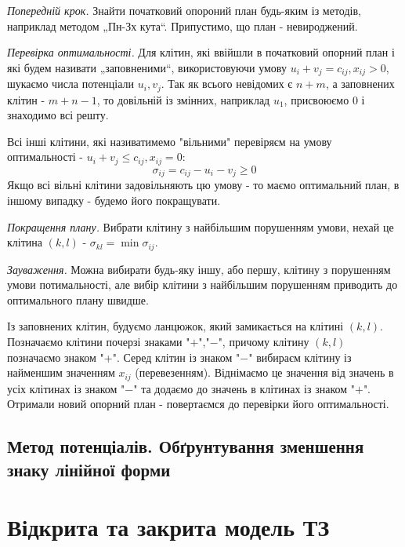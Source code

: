 \documentclass[12pt,a4paper]{book}
\newenvironment{slim_enumerate}{
\begin{enumerate}
  \setlength{\itemsep}{1pt}
  \setlength{\parskip}{0pt}
  \setlength{\parsep}{0pt}}
{\end{enumerate}}
\begin{document}
\begin{slim_enumerate}
  \item \emph{Попередній крок.} Знайти початковий опороний план будь-яким із методів, наприклад методом „Пн-Зх кута“. Припустимо, що план - невироджений.

  \item \emph{Перевірка оптимальності.} Для клітин, які ввійшли в початковий опорний план і які будем називати „заповненими“, використовуючи умову $u_i + v_j = c_{ij}, x_{ij} > 0$, шукаємо числа потенціали $u_i, v_j$. Так як всього невідомих є $n+m$, а заповнених клітин - $m+n-1$, то довільній із змінних, наприклад $u_1$, присвоюємо $0$ і знаходимо всі решту.

Всі інші клітини, які називатимемо "вільними" перевіряєм на умову оптимальності - $u_i + v_j \le c_{ij}, x_{ij} = 0$:
\begin{equation} \sigma_{ij} = c_{ij} - u_i - v_j \ge 0\end{equation}
Якщо всі вільні клітини задовільняють цю умову - то маємо оптимальний план, в іншому випадку - будемо його покращувати.

  \item \emph{Покращення плану.} Вибрати клітину з найбільшим порушенням умови, нехай це клітина $(k,l)$ - $\sigma_{kl} = \min \sigma_{ij}$.

\emph{Зауваження.} Можна вибирати будь-яку іншу, або першу, клітину з порушенням умови потимальності, але вибір клітини з найбільшим порушенням приводить до оптимального плану швидше.

Із заповнених клітин, будуємо ланцюжок, який замикається на клітині $(k,l)$. Позначаємо клітини почерзі знаками "$+$","$-$", причому клітину $(k,l)$ позначаємо знаком "+". Серед клітин із знаком "$-$" вибираєм клітину із найменшим значенням $x_{ij}$ (перевезенням). Віднімаємо це значення від значень в усіх клітинах із знаком "$-$" та додаємо до значень в клітинах із знаком "$+$". Отримали новий опорний план - повертаємся до перевірки його оптимальності.
\end{slim_enumerate}

\subsection{Метод потенціалів. Обґрунтування зменшення знаку лінійної форми}
\section{Відкрита та закрита модель ТЗ}
\end{document}
